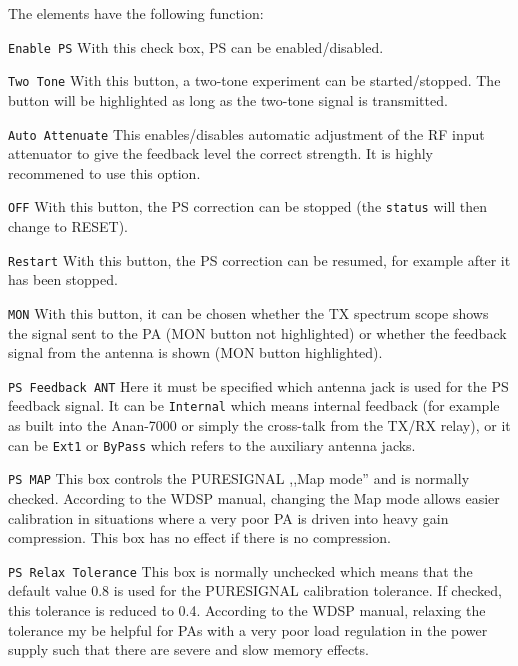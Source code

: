 \documentclass[12pt]{book}
\def\rett#1{\texttt{\color{red}#1}}
\begin{document}
The elements have the following function:

\rett{Enable PS} With this check box, PS can be enabled/disabled.

\rett{Two Tone} With this button, a two-tone experiment can be started/stopped. The button
will be highlighted as long as the two-tone signal is transmitted.

\rett{Auto Attenuate} This enables/disables automatic adjustment of the RF input
attenuator to give the feedback level the correct strength. It is highly recommened
to use this option.

\rett{OFF} With this button, the PS correction can be stopped (the \rett{status} will
then change to RESET).

\rett{Restart} With this button, the PS correction can be resumed, for example after
it has been stopped.

\rett{MON} With this button, it can be chosen whether the TX spectrum scope shows
the signal sent to the PA (MON button not highlighted) or whether the feedback signal
from the antenna is shown (MON button highlighted).

\rett{PS Feedback ANT} Here it must be specified which antenna jack is used for the
PS feedback signal. It can be \rett{Internal} which means internal feedback
(for example as built into the Anan-7000 or  simply the cross-talk from the
TX/RX relay), or it can be \rett{Ext1} or \rett{ByPass} which refers to the
auxiliary antenna jacks.

\rett{PS MAP} This box controls the PURESIGNAL ,,Map mode'' and is normally checked. 
According to the WDSP manual, changing the Map mode allows easier calibration in
situations where a very poor PA is driven into heavy gain compression. This box has
no effect if there is no compression.

\rett{PS Relax Tolerance} This box is normally unchecked which means that the default
value 0.8 is used for the PURESIGNAL calibration tolerance. If checked, this tolerance
is reduced to 0.4. According to the WDSP manual, relaxing the tolerance my be helpful
for PAs with a very poor load regulation in the power supply such that there are
severe and slow memory effects.
 
\end{document}
